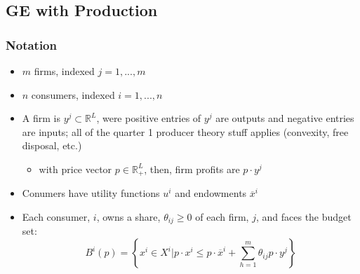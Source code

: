 \documentclass{article}
\newcommand{\R}{\mathbb{R}}
\newcommand{\olx}{\overline{x}}
\begin{document}

\subsection{GE with Production}

\subsubsection{Notation}
\begin{itemize}
	\item $m$ firms, indexed $j=1,...,m$
	\item $n$ consumers, indexed $i=1,...,n$ 
	\item A firm is $y^j\subset\R^L$, were positive entries of $y^j$ are outputs and negative entries are inputs; all of the quarter 1 producer theory stuff applies (convexity, free disposal, etc.)
		\begin{itemize}
			\item with price vector $p\in\R^L_+$, then, firm profits are $p\cdot y^j$
		\end{itemize}
	\item Conumers have utility functions $u^i$ and endowments $\olx^i$
	\item Each consumer, $i$, owns a share, $\theta_{ij}\geq 0$ of each firm, $j$, and faces the budget set:
		\[
			B^i(p)=\left\{x^i\in X^i| p\cdot x^i\leq p\cdot\olx^i + \sum_{h=1}^m\theta_{ij}p\cdot y^j \right\}
		\]
\end{itemize}
\end{document}
